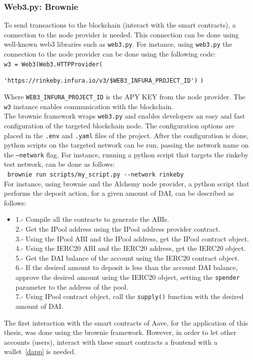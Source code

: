 \documentclass[11pt,a4paper]{report}
\begin{document}
\subsubsection{Web3.py: Brownie}
To send transactions to the blockchain (interact with the smart contracts), a connection to the node provider is needed. This connection can be done using well-known web3 libraries such as \verb|web3.py|\cite{web3py}. For instance, using \verb|web3.py| the connection to the node provider can be done using the following code:\\
\verb|w3 = Web3(Web3.HTTPProvider(|

\hspace{1cm}\verb|'https://rinkeby.infura.io/v3/$WEB3_INFURA_PROJECT_ID')| \verb|)|

Where \verb|WEB3_INFURA_PROJECT_ID| is the APY KEY from the node provider. The \verb|w3| instance enables communication with the blockchain.\\
The brownie framework\cite{brow} wraps \verb|web3.py| and enables developers an easy and fast configuration of the targeted blockchain node. The configuration options are placed in the \verb|.env| and \verb|.yaml| files of the project. After the configuration is done, python scripts on the targeted network can be run, passing the network name on the \verb|–network| flag. For instance, running a python script that targets the rinkeby test network, can be done as follows:\\
\hspace{1cm}\verb| brownie run scripts/my_script.py --network rinkeby|\\
For instance, using brownie  and the Alchemy node provider, a python script that performs the deposit action, for a given amount of DAI, can be described as follows:
\begin{itemize}
	\item[]
	1.- Compile all the contracts to generate the ABIs.\\
	2.- Get the IPool address using the IPool address provider contract.\\
	3.- Using the IPool ABI and the IPool address, get the IPool contract object.\\
	4.- Using the IERC20 ABI and the IERC20 address, get the IERC20 object.\\
	5.- Get the DAI balance of the account using the IERC20 contract object.\\
	6.- If the desired amount to deposit is less than the account DAI balance, approve the desired amount using the IERC20 object, setting the \verb|spender| parameter to the address of the pool.\\
	7.- Using IPool contract object, call the \verb|supply()| function with the desired amount of DAI.
	
\end{itemize}
The first interaction with the smart contracts of Aave, for the application of this thesis, was done using the brownie framework. However, in order to let other accounts (users), interact with these smart contracts a frontend with a wallet~\ref{dapp} is needed.
\end{document}
